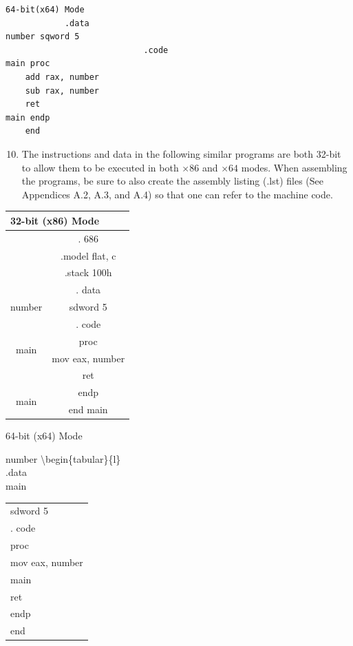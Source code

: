 \documentclass[10pt]{article}
\begin{document}
\begin{verbatim}
64-bit(x64) Mode
            .data
number sqword 5
                            .code
main proc
    add rax, number
    sub rax, number
    ret
main endp
    end
\end{verbatim}

\begin{enumerate}
  \setcounter{enumi}{9}
  \item The instructions and data in the following similar programs are both 32-bit to allow them to be executed in both $\times 86$ and $\times 64$ modes. When assembling the programs, be sure to also create the assembly listing (.lst) files (See Appendices A.2, A.3, and A.4) so that one can refer to the machine code.
\end{enumerate}

\begin{center}
\begin{tabular}{|c|c|}
\hline
\multicolumn{2}{|l|}{32-bit (x86) Mode} \\
\hline
 & . 686 \\
\hline
 & .model flat, c \\
\hline
 & .stack 100h \\
\hline
 & . data \\
\hline
number & sdword 5 \\
\hline
 & . code \\
\hline
\multirow[t]{2}{*}{main} & proc \\
\hline
 & mov eax, number \\
\hline
 & ret \\
\hline
\multirow[t]{2}{*}{main} & endp \\
\hline
 & end main \\
\hline
\end{tabular}
\end{center}

64-bit (x64) Mode

number \textbackslash begin\{tabular\}\{l\}\\
.data \\


main \begin{tabular}{l}
sdword 5 \\
. code \\
proc \\
mov eax, number \\
main \\
ret \\
endp \\
end \\
\end{tabular}
\end{document}
